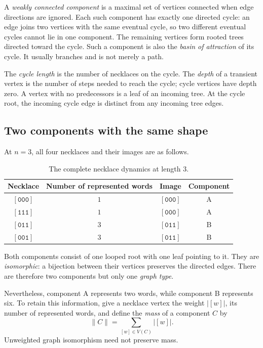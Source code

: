 \documentclass[11pt]{article}
\theoremstyle{definition}
\newcommand{\neck}[1]{[\mathtt{#1}]}
\numberwithin{equation}{section}
\begin{document}
A \emph{weakly connected component} is a maximal set of vertices
connected when edge directions are ignored. Each such component has
exactly one directed cycle: an edge joins two vertices with the same
eventual cycle, so two different eventual cycles cannot lie in one
component. The remaining vertices form rooted trees directed toward
the cycle. Such a component is also the \emph{basin of attraction} of
its cycle. It usually branches and is not merely a path.

The \emph{cycle length} is the number of necklaces on the cycle. The
\emph{depth} of a transient vertex is the number of steps needed to
reach the cycle; cycle vertices have depth zero. A vertex with no
predecessors is a leaf of an incoming tree. At the cycle root, the
incoming cycle edge is distinct from any incoming tree edges.

\subsection{Two components with the same shape}

At $n=3$, all four necklaces and their images are as follows.
\begin{table}[htbp]
\centering
\renewcommand{\arraystretch}{1.2}
\begin{tabular}{@{}cccc@{}}
\toprule
Necklace & Number of represented words & Image & Component\\
\midrule
$\neck{000}$ & $1$ & $\neck{000}$ & A\\
$\neck{111}$ & $1$ & $\neck{000}$ & A\\
$\neck{011}$ & $3$ & $\neck{011}$ & B\\
$\neck{001}$ & $3$ & $\neck{011}$ & B\\
\bottomrule
\end{tabular}
\caption{The complete necklace dynamics at length $3$.}
\label{tab:three}
\end{table}
Both components consist of one looped root with one leaf pointing to it.
They are \emph{isomorphic}: a bijection between their vertices preserves
the directed edges. There are therefore two components but only one
\emph{graph type}.

Nevertheless, component A represents two words, while component B
represents six. To retain this information, give a necklace vertex the
weight $|[w]|$, its number of represented words, and define the
\emph{mass} of a component $C$ by
\begin{equation}\label{eq:mass}
 \lVert C\rVert=\sum_{[w]\in V(C)}|[w]|.
\end{equation}
Unweighted graph isomorphism need not preserve mass.
\end{document}
